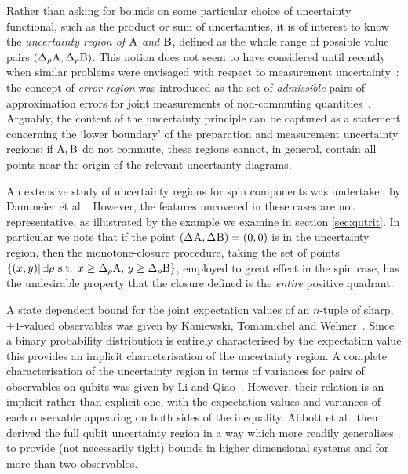 Rather than asking for bounds on some particular choice of uncertainty functional, such as the product or sum of uncertainties, it is of interest to know the \emph{uncertainty region of $\operatorname{A}$ and $\operatorname{B}$}, defined as the whole range of possible value pairs $(\sdevr{\opa},\sdevr{\opb})$. This notion does not seem to have considered until recently when similar problems were envisaged with respect to measurement uncertainty~\cite{dsw-meas-ur-ang-mom,LiQiao2015,ZhangZhangYu2017,BuschBullock2018}: the concept of {\em error region} was introduced as the set of {\em admissible} pairs of approximation errors for joint measurements of non-commuting quantities~\cite{BuschHeinosaari2008}. Arguably, the content of the uncertainty principle can be captured as a statement concerning the `lower boundary' of the preparation and measurement uncertainty regions:
if $\operatorname{A},\operatorname{B}$ do not commute, these regions cannot, in general, contain all points near the origin of the relevant uncertainty diagrams.

An extensive study of uncertainty regions for spin components was undertaken by  Dammeier et al.~\cite{dsw-meas-ur-ang-mom}
However, the features uncovered in these cases are not representative, as illustrated by the example we examine in section \ref{sec:qutrit}. In particular we note that if the point $(\sdev{\opa},\sdev{\opb} ) = (0,0)$ is in the uncertainty region, then the monotone-closure procedure, taking the set of points $\{(x,y) |\, \exists \rho \text{ s.t. } x\geq \sdevr{\opa},\, y\geq\sdevr{\opb}\}$, employed to great effect in the spin case, has the undesirable property that the closure defined is the \emph{entire} positive quadrant.

A state dependent bound for the joint expectation values of an $n$-tuple of sharp, $\pm 1$-valued observables was given by Kaniewski, Tomamichel and Wehner~\cite{KaniewskiTomamichelWehner2015}. Since a binary probability distribution is entirely characterised by the expectation value this provides an implicit characterisation of the uncertainty region. A complete characterisation of the uncertainty region in terms of variances for pairs of observables on qubits was given by Li and Qiao~\cite{LiQiao2015}. However, their relation is an implicit rather than explicit one, with the expectation values and variances of each observable appearing on both sides of the inequality. Abbott et al~\cite{AbbottAlzieuHallBranciard2016}  then derived the full qubit uncertainty region in a way which more readily generalises to provide (not necessarily tight) bounds in higher dimensional systems and for more than two observables.

